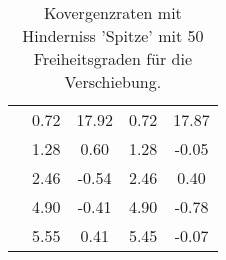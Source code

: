 \begin{table}
\begin{tabular}{c|cc|cc|}
\multicolumn{1}{|c|}{} & \multicolumn{1}{|c|}{      0.72} & \multicolumn{1}{|c|}{     17.92} & \multicolumn{1}{|c|}{      0.72} & \multicolumn{1}{|c|}{     17.87} \\ 
\multicolumn{1}{|c|}{} & \multicolumn{1}{|c|}{      1.28} & \multicolumn{1}{|c|}{      0.60} & \multicolumn{1}{|c|}{      1.28} & \multicolumn{1}{|c|}{     -0.05} \\ 
\multicolumn{1}{|c|}{} & \multicolumn{1}{|c|}{      2.46} & \multicolumn{1}{|c|}{     -0.54} & \multicolumn{1}{|c|}{      2.46} & \multicolumn{1}{|c|}{      0.40} \\ 
\multicolumn{1}{|c|}{} & \multicolumn{1}{|c|}{      4.90} & \multicolumn{1}{|c|}{     -0.41} & \multicolumn{1}{|c|}{      4.90} & \multicolumn{1}{|c|}{     -0.78} \\ 
\multicolumn{1}{|c|}{} & \multicolumn{1}{|c|}{      5.55} & \multicolumn{1}{|c|}{      0.41} & \multicolumn{1}{|c|}{      5.45} & \multicolumn{1}{|c|}{     -0.07} \\ 
\hline 
\end{tabular}\caption{Kovergenzraten mit Hinderniss 'Spitze' mit 50 Freiheitsgraden für die Verschiebung.}\label{tab:Rate_Spitze_level1}
\end{table} 
